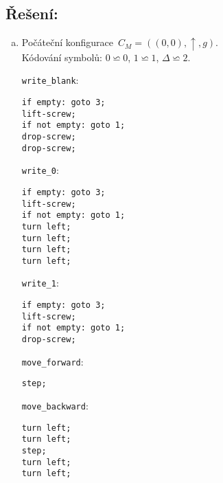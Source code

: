 \documentclass[a4paper, 11pt]{scrartcl}
\begin{document}
	\subsection*{Řešení:}

	\begin{enumerate}[(a)]
		\item
		    Počáteční konfigurace~$ C_M = ((0, 0), \uparrow, g) $. \\
		    Kódování symbolů: $ 0 \backsimeq 0 $, $ 1 \backsimeq 1 $,
		    $ \Delta \backsimeq 2 $.

            \texttt{write\_blank}:
            \begin{lstlisting}
if empty: goto 3;
lift-screw;
if not empty: goto 1;
drop-screw;
drop-screw;
            \end{lstlisting}
            
            \texttt{write\_0}:
            \begin{lstlisting}
if empty: goto 3;
lift-screw;
if not empty: goto 1;
turn left;
turn left;
turn left;
turn left;
            \end{lstlisting}
            
            \newpage
            \texttt{write\_1}:
            \begin{lstlisting}
if empty: goto 3;
lift-screw;
if not empty: goto 1;
drop-screw;
            \end{lstlisting}
            
            \texttt{move\_forward}:
            \begin{lstlisting}
step;
            \end{lstlisting}
            
            \texttt{move\_backward}:
            \begin{lstlisting}
turn left;
turn left;
step;
turn left;
turn left;
            \end{lstlisting}
	\end{enumerate}
\end{document}
